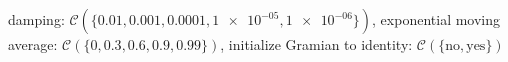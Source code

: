 damping: $\mathcal{C}(\{\num[scientific-notation=true]{0.01},\num[scientific-notation=true]{0.001},\num[scientific-notation=true]{0.0001},\num[scientific-notation=true]{1e-05},\num[scientific-notation=true]{1e-06}\})$, exponential moving average: $\mathcal{C}(\{\num[scientific-notation=false]{0},\num[scientific-notation=true]{0.3},\num[scientific-notation=true]{0.6},\num[scientific-notation=true]{0.9},\num[scientific-notation=true]{0.99}\})$, initialize Gramian to identity: $\mathcal{C}(\{\text{no},\text{yes}\})$